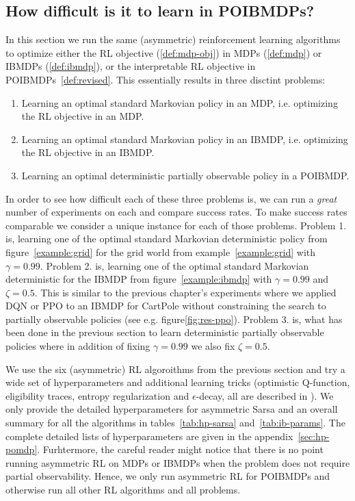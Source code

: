\subsection{How difficult is it to learn in POIBMDPs?}

In this section we run the same (asymmetric) reinforcement learning algorithms to optimize either the RL objective (\ref{def:mdp-obj}) in MDPs (\ref{def:mdp}) or IBMDPs (\ref{def:ibmdp}), or the interpretable RL objective in POIBMDPs~\ref{def:revised}.
This essentially results in three disctint problems:
\begin{enumerate}
    \item Learning an optimal standard Markovian policy in an MDP, i.e. optimizing the RL objective in an MDP.
    \item Learning an optimal standard Markovian policy in an IBMDP, i.e. optimizing the RL objective in an IBMDP.
    \item Learning an optimal deterministic partially observable policy in a POIBMDP.
\end{enumerate}

In order to see how difficult each of these three problems is, we can run a \textit{great} number of experiments on each and compare success rates.
To make success rates comparable we consider a unique instance for each of those problems.
Problem 1. is, learning one of the optimal standard Markovian deterministic policy from figure~\ref{example:grid} for the grid world from example~\ref{example:grid} with $\gamma=0.99$.
Problem 2. is, learning one of the optimal standard Markovian deterministic for the IBMDP from figure~\ref{example:ibmdp} with $\gamma=0.99$ and $\zeta=0.5$.
This is similar to the previous chapter's experiments where we applied DQN or PPO to an IBMDP for CartPole without constraining the search to partially observable policies (see e.g. figure\ref{fig:res-ppo}).
Problem 3. is, what has been done in the previous section to learn deterministic partially observable policies where in addition of fixing $\gamma=0.99$ we also fix $\zeta=0.5$.

We use the six (asymmetric) RL algoroithms from the previous section and try a wide set of hyperparameters and additional learning tricks (optimistic Q-function, eligibility traces, entropy regularization and $\epsilon$-decay, all are described in \cite{sutton}).
We only provide the detailed hyperparameters for asymmetric Sarsa and an overall summary for all the algorithms in tables~\ref{tab:hp-sarsa} and~\ref{tab:ib-params}.
The complete detailed lists of hyperparameters are given in the appendix~\ref{sec:hp-pomdp}.
Furhtermore, the careful reader might notice that there is no point running asymmetric RL on MDPs or IBMDPs when the problem does not require partial observability.
Hence, we only run asymmetric RL for POIBMDPs and otherwise run all other RL algorithms and all problems.


